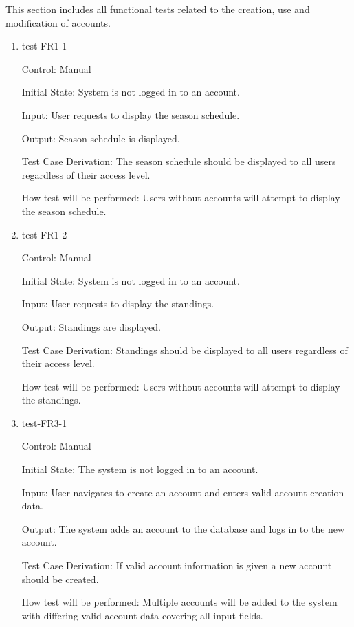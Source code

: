 \documentclass[12pt, titlepage]{article}
\begin{document}
This section includes all functional tests related to the creation, use and
modification of accounts.

\begin{enumerate}

  \item{test-FR1-1\\}

  Control: Manual

  Initial State: System is not logged in to an account.

  Input: User requests to display the season schedule.

  Output: Season schedule is displayed.

  Test Case Derivation: The season schedule should be displayed to all users
  regardless of their access level.

  How test will be performed: Users without accounts will attempt to display
  the season schedule.

  \item{test-FR1-2\\}

  Control: Manual

  Initial State: System is not logged in to an account.

  Input: User requests to display the standings.

  Output: Standings are displayed.

  Test Case Derivation: Standings should be displayed to all users
  regardless of their access level.

  How test will be performed: Users without accounts will attempt to display
  the standings.

  \item{test-FR3-1\\}

  Control: Manual

  Initial State: The system is not logged in to an account.

  Input: User navigates to create an account and enters valid account creation
  data.

  Output: The system adds an account to the database and logs in to the new
  account.

  Test Case Derivation: If valid account information is given a new account
  should be created.

  How test will be performed: Multiple accounts will be added to the system
  with differing valid account data covering all input fields.


\end{enumerate}
\end{document}
